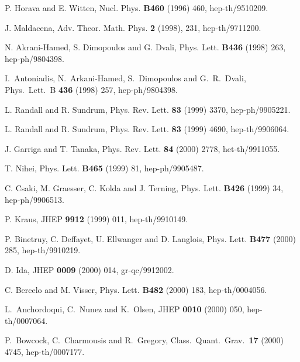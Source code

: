 \documentclass[a4paper,11pt]{article}
\begin{document}
\begin{thebibliography}{99}

 P. Horava and E. Witten, Nucl. Phys. {\bf B460} (1996) 460, 
hep-th/9510209.


 J. Maldacena, Adv. Theor. Math. Phys. {\bf 2} (1998), 231, 
hep-th/9711200.

 N. Akrani-Hamed, S. Dimopoulos and G. Dvali, Phys. Lett. 
{\bf B436} (1998) 263, hep-ph/9804398.

I.~Antoniadis, N.~Arkani-Hamed, S.~Dimopoulos and G.~R.~Dvali, Phys.\ Lett.\ B {\bf 436} (1998) 257, hep-ph/9804398.

 L. Randall and R. Sundrum, Phys. Rev. Lett. {\bf 83} (1999) 
3370, hep-ph/9905221.

  L. Randall and R. Sundrum, Phys. Rev. Lett. {\bf 83} (1999)
4690, hep-th/9906064.

J. Garriga and T. Tanaka, Phys. Rev. Lett. {\bf 84} (2000) 2778, het-th/9911055.

T. Nihei, Phys. Lett. {\bf B465} (1999) 81, hep-ph/9905487.

 C. Csaki, M. Graesser, C. Kolda and J. Terning,  Phys. 
Lett. {\bf B426} (1999) 34, hep-ph/9906513.

 P. Kraus, JHEP {\bf 9912} (1999) 011, hep-th/9910149.

 P. Binetruy, C. Deffayet, U. Ellwanger and D. Langlois, 
Phys. Lett. {\bf B477} (2000) 285, hep-th/9910219.
 
 D. Ida, JHEP {\bf 0009} (2000) 014, gr-qc/9912002.

 C. Bercelo and M. Visser, Phys. Lett. {\bf B482} (2000) 183, 
hep-th/0004056.

L.~Anchordoqui, C.~Nunez and K.~Olsen, JHEP {\bf 0010} (2000) 050, hep-th/0007064.

P.~Bowcock, C.~Charmousis and R.~Gregory, Class.\ Quant.\ Grav.\  {\bf 17} (2000) 4745, hep-th/0007177.


\end{thebibliography}
\end{document}

